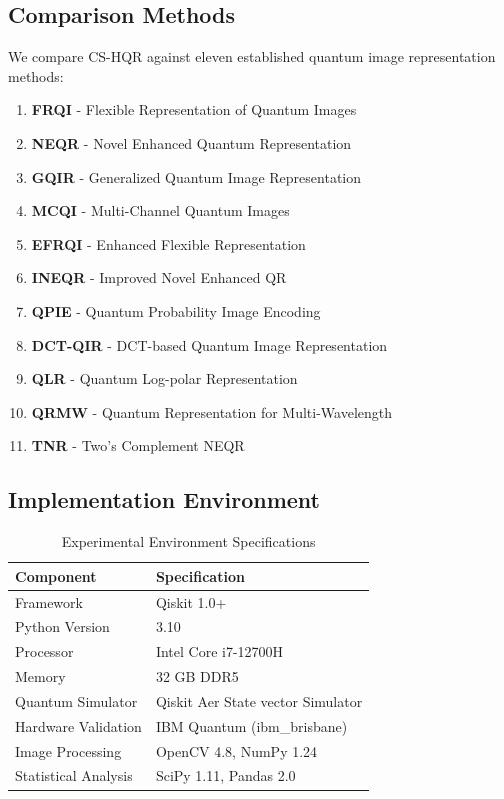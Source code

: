 \documentclass[11pt,a4paper]{article}
\begin{document}
\subsection{Comparison Methods}

We compare CS-HQR against eleven established quantum image representation methods:

\begin{enumerate}
    \item \textbf{FRQI} - Flexible Representation of Quantum Images \cite{ref3}
    \item \textbf{NEQR} - Novel Enhanced Quantum Representation \cite{ref4}
    \item \textbf{GQIR} - Generalized Quantum Image Representation \cite{ref18}
    \item \textbf{MCQI} - Multi-Channel Quantum Images \cite{ref8}
    \item \textbf{EFRQI} - Enhanced Flexible Representation \cite{ref32}
    \item \textbf{INEQR} - Improved Novel Enhanced QR \cite{ref33}
    \item \textbf{QPIE} - Quantum Probability Image Encoding \cite{ref24}
    \item \textbf{DCT-QIR} - DCT-based Quantum Image Representation \cite{ref25}
    \item \textbf{QLR} - Quantum Log-polar Representation \cite{ref19}
    \item \textbf{QRMW} - Quantum Representation for Multi-Wavelength \cite{ref33}
    \item \textbf{TNR} - Two's Complement NEQR \cite{ref4}
\end{enumerate}

\subsection{Implementation Environment}

\begin{table}[H]
\centering
\caption{Experimental Environment Specifications}
\label{tab:environment}
\begin{tabular}{@{}ll@{}}
\toprule
\textbf{Component} & \textbf{Specification} \\
\midrule
Framework & Qiskit 1.0+ \cite{ref47} \\
Python Version & 3.10 \\
Processor & Intel Core i7-12700H \\
Memory & 32 GB DDR5 \\
Quantum Simulator & Qiskit Aer State vector Simulator \\
Hardware Validation & IBM Quantum (ibm\_brisbane) \\
Image Processing & OpenCV 4.8, NumPy 1.24 \\
Statistical Analysis & SciPy 1.11, Pandas 2.0 \\
\bottomrule
\end{tabular}
\end{table}
\end{document}
